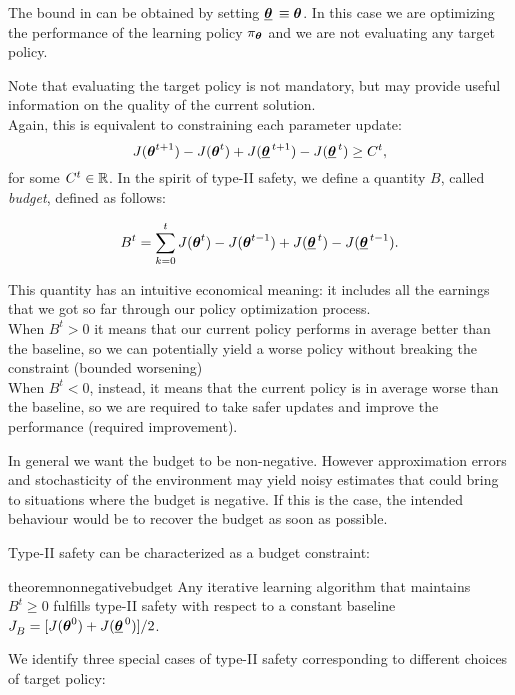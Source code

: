 \begin{note}
The bound in  can be obtained by setting $\vtarget[] \equiv \vtheta$. In this case we are optimizing the performance of the learning policy $\pi_{\vtheta}$ and we are not evaluating any target policy.
\end{note}

Note that evaluating the target policy is not mandatory, but may provide useful information on the quality of the current solution. \\
Again, this is equivalent to constraining each parameter update:
\begin{equation}\label{con:type2}
J(\vtheta^{t+1}) - J(\vtheta^{t}) + J(\vtarget[t+1]) - J(\vtarget) \geq C^t,
\end{equation}
for some $C^t\in \realspace$.
%
In the spirit of type-II safety, we define a quantity $B$, called \textit{budget}, defined as follows:
\begin{definition}[Budget]
\begin{equation}
B^t =  \sum_{k=0}^{t} J(\vtheta^t) - J(\vtheta^{t-1}) + J(\vtarget) - J(\vtarget[t-1]).
\label{eq:budget}
\end{equation}
\end{definition}
This quantity has an intuitive economical meaning: it includes all the earnings that we got so far through our policy optimization process.\\ 
When $B^t > 0$ it means that our current policy performs in average better than the baseline, so we can potentially yield a worse policy without breaking the constraint (bounded worsening)\\
When $B^t<0$, instead, it means that the current policy is in average worse than the baseline, so we are required to take safer updates and improve the performance (required improvement). 

\begin{note}
In general we want the budget to be non-negative. However approximation errors and stochasticity of the environment may yield noisy estimates that could bring to situations where the budget is negative. If this is the case, the intended behaviour would be to recover the budget as soon as possible.
\end{note}

Type-II safety can be characterized as a budget constraint:
\begin{restatable}{theorem}{nonnegativebudget}\label{th:nonnegativebudget}
Any iterative learning algorithm that maintains $B^t \geq 0$ fulfills type-II safety with respect to a constant baseline $\jbase[] = [J(\vtheta^0) + J(\vtarget[0])] / 2$.
\end{restatable}
%
We identify three special cases of type-II safety corresponding to different choices of target policy:

